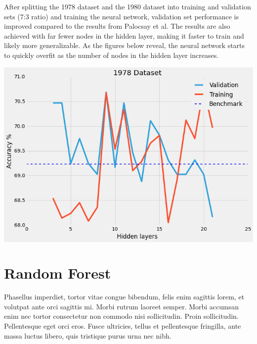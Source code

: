 \documentclass[a0,landscape]{a0poster}
\begin{document}
\begin{multicols}{4}
After splitting the 1978 dataset and the 1980 dataset into training and validation sets (7:3 ratio) and training the neural network, validation set performance is improved compared to the results from Palocsay et al. The results are also achieved with far fewer nodes in the hidden layer, making it faster to train and likely more generalizable. As the figures below reveal, the neural network starts to quickly overfit as the number of nodes in the hidden layer increases.

\begin{center}\vspace{1cm}
\includegraphics[width=0.9\linewidth]{1978}
\end{center}\vspace{1cm}


\section*{Random Forest}


Phasellus imperdiet, tortor vitae congue bibendum, felis enim sagittis lorem, et volutpat ante orci sagittis mi. Morbi rutrum laoreet semper. Morbi accumsan enim nec tortor consectetur non commodo nisi sollicitudin. Proin sollicitudin. Pellentesque eget orci eros. Fusce ultricies, tellus et pellentesque fringilla, ante massa luctus libero, quis tristique purus urna nec nibh.


\end{multicols}
\end{document}
